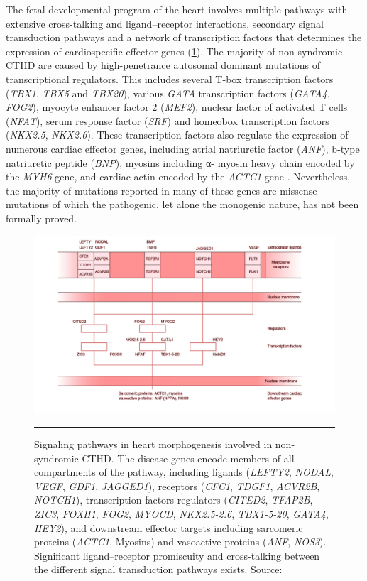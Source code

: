 \begin{refsection}
The fetal developmental program of the heart involves multiple pathways with extensive cross-talking and ligand–receptor interactions, secondary signal transduction pathways and a network of transcription factors that determines the expression of cardiospecific effector genes (\cref{fig:1_5}).
The majority of non-syndromic CTHD are caused by high-penetrance autosomal dominant mutations of transcriptional regulators. This includes several T-box transcription factors (\textit{TBX1}, \textit{TBX5} and \textit{TBX20}), various \textit{GATA} transcription factors (\textit{GATA4}, \textit{FOG2}), myocyte enhancer factor 2 (\textit{MEF2}), nuclear factor of activated T cells (\textit{NFAT}), serum response factor (\textit{SRF}) and homeobox transcription factors (\textit{NKX2.5}, \textit{NKX2.6}). These transcription factors also regulate the expression of numerous cardiac effector genes, including atrial natriuretic factor (\textit{ANF}), b-type natriuretic peptide (\textit{BNP}), myosins including α- myosin heavy chain  encoded by the \textit{MYH6} gene, and cardiac actin encoded by the \textit{ACTC1} gene \cite{wessels2010genetic}. Nevertheless, the majority of mutations reported in many of these genes are missense mutations of which the pathogenic, let alone the monogenic nature, has not been formally proved.

\begin{figure}
\centering
\includegraphics[scale=0.87,keepaspectratio]{Figures/Figure1_5.pdf}
\rule{35em}{0.5pt}
\caption[Signaling pathways in heart morphogenesis involved in non-syndromic CTHD]{Signaling pathways in heart morphogenesis involved in non-syndromic CTHD. The disease genes encode members of all compartments of the pathway, including ligands (\textit{LEFTY2}, \textit{NODAL}, \textit{VEGF}, \textit{GDF1}, \textit{JAGGED1}), receptors (\textit{CFC1}, \textit{TDGF1}, \textit{ACVR2B}, \textit{NOTCH1}), transcription factors-regulators (\textit{CITED2}, \textit{TFAP2B}, \textit{ZIC3}, \textit{FOXH1}, \textit{FOG2}, \textit{MYOCD}, \textit{NKX2.5-2.6}, \textit{TBX1-5-20}, \textit{GATA4}, \textit{HEY2}), and downstream effector targets including sarcomeric proteins (\textit{ACTC1}, Myosins) and vasoactive proteins (\textit{ANF}, \textit{NOS3}). Significant ligand–receptor promiscuity and cross-talking between the different signal transduction pathways exists. Source: \cite{wessels2010genetic}}
\label{fig:1_5}
\end{figure}


\end{refsection}
